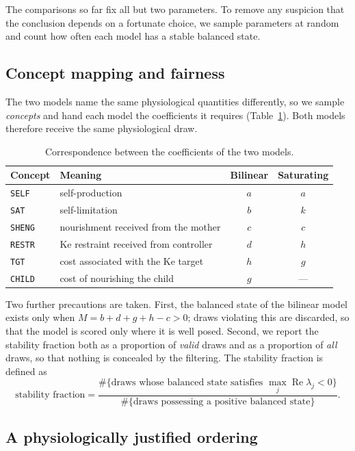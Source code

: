 \documentclass[11pt]{article}
\begin{document}
The comparisons so far fix all but two parameters. To remove any suspicion that
the conclusion depends on a fortunate choice, we sample parameters at random and
count how often each model has a stable balanced state.

\subsection{Concept mapping and fairness}

The two models name the same physiological quantities differently, so we sample
\emph{concepts} and hand each model the coefficients it requires
(Table~\ref{tab:concepts}). Both models therefore receive the same physiological
draw.

\begin{table}[!htb]
\centering
\begin{tabular}{llcc}
\toprule
Concept & Meaning & Bilinear & Saturating \\
\midrule
\texttt{SELF}  & self-production                       & $a$ & $a$ \\
\texttt{SAT}   & self-limitation                       & $b$ & $k$ \\
\texttt{SHENG} & nourishment received from the mother  & $c$ & $c$ \\
\texttt{RESTR} & Ke restraint received from controller & $d$ & $h$ \\
\texttt{TGT}   & cost associated with the Ke target    & $h$ & $g$ \\
\texttt{CHILD} & cost of nourishing the child          & $g$ & --- \\
\bottomrule
\end{tabular}
\caption{Correspondence between the coefficients of the two models.}
\label{tab:concepts}
\end{table}

Two further precautions are taken. First, the balanced state of the bilinear
model exists only when $M=b+d+g+h-c>0$; draws violating this are discarded, so
that the model is scored only where it is well posed. Second, we report the
stability fraction both as a proportion of \emph{valid} draws and as a
proportion of \emph{all} draws, so that nothing is concealed by the filtering.
The stability fraction is defined as
\[
\text{stability fraction}=
\frac{\#\{\text{draws whose balanced state satisfies } \max_j\operatorname{Re}\lambda_j<0\}}
     {\#\{\text{draws possessing a positive balanced state}\}} .
\]

\subsection{A physiologically justified ordering}
\end{document}
